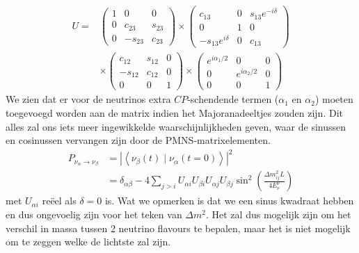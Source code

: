 \documentclass[../main.tex]{subfiles}
\begin{document}
\begin{equation}
    \begin{aligned}
        \label{eq:pmns_matrix_ontbonden}
        U =&\left(\begin{array}{ccc}
                1 & 0 & 0 \\
                0 & c_{23} & s_{23} \\
                0 & -s_{23} & c_{23}
                \end{array}\right) \times\left(\begin{array}{ccc}
                c_{13} & 0 & s_{13} e^{-i \delta} \\
                0 & 1 & 0 \\
                -s_{13} e^{i \delta} & 0 & c_{13}
        \end{array}\right) \\
        &\times\left(\begin{array}{ccc}
                c_{12} & s_{12} & 0 \\
                -s_{12} & c_{12} & 0 \\
                0 & 0 & 1
                \end{array}\right) \times\left(\begin{array}{ccc}
                e^{i \alpha_{1} / 2} & 0 & 0 \\
                0 & e^{i \alpha_{2} / 2} & 0 \\
                0 & 0 & 1
        \end{array}\right)
    \end{aligned}
\end{equation}
We zien dat er voor de neutrinos extra $CP$-schendende termen ($\alpha_1$ en $\alpha_2$) moeten toegevoegd worden aan de matrix indien het Majoranadeeltjes zouden zijn. Dit alles zal ons iets meer ingewikkelde waarschijnlijkheden geven, waar de sinussen en cosinussen vervangen zijn door de PMNS-matrixelementen.
\begin{equation}
    \begin{aligned}
        \label{eq:neutrino_3_oscilaties_2}
        P_{\nu_{\alpha} \rightarrow \nu_{\beta}} &=\left|\left<\nu_{\beta}(t)\mid \nu_{\alpha}(t=0)\right>\right|^{2} \\
                                                 &=\delta_{\alpha \beta}-4 \sum_{j>i} U_{\alpha i} U_{\beta i} U_{\alpha j} U_{\beta j} \sin ^{2}\left(\frac{\Delta m_{i j}^{2} L}{4 E_{\nu}^{\nu}}\right)
    \end{aligned}
\end{equation}
met $U_{\alpha i}$ reëel als $\delta=0$ is. Wat we opmerken is dat we een sinus kwadraat hebben en dus ongevoelig zijn voor het teken van $\Delta m^2$. Het zal dus mogelijk zijn om het verschil in massa tussen 2 neutrino flavours te bepalen, maar het is niet mogelijk om te zeggen welke de lichtste zal zijn.
\end{document}
